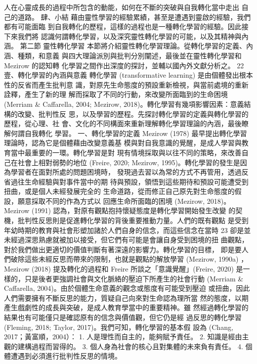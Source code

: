 人在心靈成長的過程中所包含的動能，如何在不斷的突破與自我轉化當中走出
自己的道路。 
肆、小結 
藉由靈性學習的經驗累績，甚至是遭遇到靈啟的經驗，我們都有可能面臨
到自我轉化的歷程，這樣的過程也是一種轉化學習的經驗。因此接下來我們將
認識何謂轉化學習，以及深究靈性轉化學習的可能，以及其精神與內涵。 
第二節 靈性轉化學習 
本節將介紹靈性轉化學習理論。從轉化學習的定義、內涵、種類，和意義
與四大理論派別與批判分別闡述，最後並在靈性轉化學習和 Mezirow 的認知轉
化學習之間作出深度的探討，並輔以國內外文獻分析之。 
22 
壹、轉化學習的內涵與意義 
轉化學習 (transformative learning) 是由個體發出根本性的反省而產生批判意
識，對原先生命態度的預設重新檢視，與當前處境的重新詮釋，產生了新的理
解而採取了不同的行動，來改變所面臨到的生命困境 (Merriam & Caffarella, 
2004; Mezirow, 2018)。轉化學習有幾項影響因素：意義結構的改變、批判性反
思，以及學習的歷程。先探討轉化學習的定義與轉化學習的歷程，從心理、社
會、文化的不同構面來重新理解轉化學習理論的內涵，最後瞭解何謂自我轉化
學習。 
一、轉化學習的定義 
Mezirow (1978) 最早提出轉化學習理論時，認為它是個體藉由改變意義基
模與對自我意識的覺醒，是成人學習與教育當中最重要的一環。轉化學習是對
現有情境採取與以往不同的策略，來改善自己在社會上相對弱勢的地位 (Freire, 
2020; Mezirow, 1995)。轉化學習的發生是因為學習者在面對所處的問題困境時，
發現過去習以為常的方式不再管用，透過反省過往生命經驗與對事件當中的期
待與預設，領悟到這些期待和預設可能遭受到扭曲，或是個人未經發展完全的
生命道路，從而修正自己原先對生命態度的假設，願意採取不同的作為方式以
回應生命所面臨的困境 (Mezirow, 2018)。 
Mezirow (1991) 認為，對原有觀點抱持懷疑態度是轉化學習開始發生改變
的契機，批判性反思則是促進轉化學習的背後重要推動力量。人們的既有觀點
是受到年幼時期的教育與社會形塑加諸於人們自身的信念，而這些信念在當時
23 
卻是並未經過深思熟慮就被加以接受，但它們有可能是會讓自身受到困境的扭
曲觀點，對於我們做出更適切的價值判斷有著深遠的影響力。轉化學習的目標，
即是要人們破除這些未經反思而帶來的限制，也就是觀點的解放學習 (Mezirow, 
1990a) ，Mezirow (2018) 提及轉化的過程和 Freire 所談之「意識覺醒」(Freire, 
2020) 是一樣的，只是後者更強調社會與文化脈絡的壓迫下所產生的社會行動 
(Merriam & Caffarella, 2004)。由於個體生命意義的觀念或態度有可能受到壓迫
或扭曲，因此人們需要擁有不斷反思的能力，質疑自己向來對生命認為理所當
然的態度，以期產生戲劇性的成長與突破，是成人教育學當中的重要精神。雖
然經過轉化學習的結果也有可能僅只是確認原有的信念與價值觀，但它仍是經
過反思的轉化學習 (Fleming, 2018; Taylor, 2017)。我們可知，轉化學習的基本假
設為 (Chang, 2017；黃富順，2004）： 
1. 人是理性而自主的，能夠賦予責任。 
2. 知識是經由主觀的建構過程而習得的。 
3. 個人身為社會的核心且對集體的未來負有責任。 
4. 個體遭遇到必須進行批判性反思的情境。 
